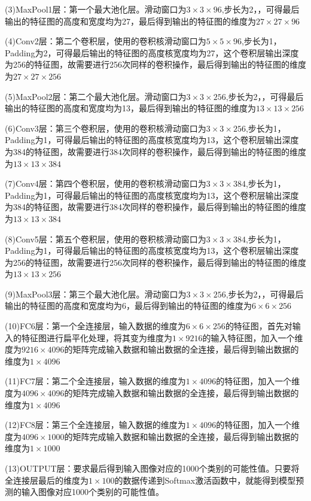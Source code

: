 \documentclass[openbib]{article}
\begin{document}
(3)MaxPool1层：第一个最大池化层。滑动窗口为$3\times3\times96$,步长为2，，可得最后输出的特征图的高度和宽度均为27，最后得到输出的特征图的维度为$27\times27\times96$

(4)Conv2层：第二个卷积层，使用的卷积核滑动窗口为$5\times5\times96$,步长为1，Padding为2，可得最后输出的特征图的高度核宽度均为27，这个卷积层输出深度为256的特征图，故需要进行256次同样的卷积操作，最后得到输出的特征图的维度为$27\times27\times256$

(5)MaxPool2层：第二个最大池化层。滑动窗口为$3\times3\times256$,步长为2，，可得最后输出的特征图的高度和宽度均为13，最后得到输出的特征图的维度为$13\times13\times256$

(6)Conv3层：第三个卷积层，使用的卷积核滑动窗口为$3\times3\times256$,步长为1，Padding为1，可得最后输出的特征图的高度核宽度均为13，这个卷积层输出深度为384的特征图，故需要进行384次同样的卷积操作，最后得到输出的特征图的维度为$13\times13\times384$

(7)Conv4层：第四个卷积层，使用的卷积核滑动窗口为$3\times3\times384$,步长为1，Padding为1，可得最后输出的特征图的高度核宽度均为13，这个卷积层输出深度为384的特征图，故需要进行384次同样的卷积操作，最后得到输出的特征图的维度为$13\times13\times384$

(8)Conv5层：第五个卷积层，使用的卷积核滑动窗口为$3\times3\times384$,步长为1，Padding为1，可得最后输出的特征图的高度核宽度均为13，这个卷积层输出深度为256的特征图，故需要进行256次同样的卷积操作，最后得到输出的特征图的维度为$13\times13\times256$

(9)MaxPool3层：第三个最大池化层。滑动窗口为$3\times3\times256$,步长为2，，可得最后输出的特征图的高度和宽度均为6，最后得到输出的特征图的维度为$6\times6\times256$

(10)FC6层：第一个全连接层，输入数据的维度为$6\times6\times256$的特征图，首先对输入的特征图进行扁平化处理，将其变为维度为$1\times9216$的输入特征图，加入一个维度为$9216\times4096$的矩阵完成输入数据和输出数据的全连接，最后得到输出数据的维度为$1\times4096$

(11)FC7层：第二个全连接层，输入数据的维度为$1\times4096$的特征图，加入一个维度为$4096\times4096$的矩阵完成输入数据和输出数据的全连接，最后得到输出数据的维度为$1\times4096$

(12)FC8层：第三个全连接层，输入数据的维度为$1\times4096$的特征图，加入一个维度为$4096\times1000$的矩阵完成输入数据和输出数据的全连接，最后得到输出数据的维度为$1\times1000$

(13)OUTPUT层：要求最后得到输入图像对应的1000个类别的可能性值。只要将全连接层最后的维度为$1\times100$的数据传递到Softmax激活函数中，就能得到模型预测的输入图像对应1000个类别的可能性值。
\end{document}
